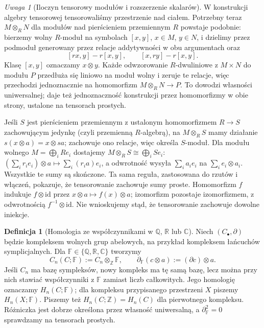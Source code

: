 \documentclass[11pt,a4paper,oneside]{report}
\newcommand{\R}{\mathbb{R}}
\newcommand{\C}{\mathbb{C}}
\newcommand{\Z}{\mathbb{Z}}
\newcommand{\Q}{\mathbb{Q}}
\newcommand{\id}{\mathrm{id}}
\theoremstyle{plain}
\theoremstyle{definition}
\newtheorem{definicja}[twierdzenie]{Definicja}
\theoremstyle{remark}
\newtheorem{uwaga}[twierdzenie]{Uwaga}
\begin{document}
\begin{uwaga}[Iloczyn tensorowy modułów i rozszerzenie skalarów]
\label{uwaga:tensor-modulow}
W konstrukcji algebry tensorowej tensorowaliśmy przestrzenie
nad ciałem. Potrzebny teraz $M\otimes_R N$ dla modułów nad
pierścieniem przemiennym $R$ powstaje podobnie: bierzemy wolny
$R$-moduł na symbolach $[x,y]$, $x\in M$, $y\in N$, i dzielimy
przez podmoduł generowany przez relacje addytywności w obu argumentach
oraz
\[
 [rx,y]-r[x,y],\qquad [x,ry]-r[x,y].
\]
Klasę $[x,y]$ oznaczamy $x\otimes y$. Każde odwzorowanie
$R$-dwuliniowe z $M\times N$ do modułu $P$ przedłuża się liniowo
na moduł wolny i zeruje te relacje, więc przechodzi jednoznacznie
na homomorfizm $M\otimes_R N\to P$. To dowodzi własności uniwersalnej;
daje też jednoznaczność konstrukcji przez homomorfizmy w obie strony,
ustalone na tensorach prostych.

Jeśli $S$ jest pierścieniem przemiennym z ustalonym homomorfizmem
$R\to S$ zachowującym jedynkę (czyli przemienną $R$-algebrą),
na $M\otimes_R S$ mamy
działanie $s(x\otimes a)=x\otimes sa$; zachowuje ono relacje,
więc określa $S$-moduł. Dla modułu wolnego
$M=\bigoplus_i Re_i$ dostajemy
$M\otimes_R S\cong\bigoplus_i Se_i$:
$ (\sum_i r_i e_i)\otimes a\mapsto\sum_i(r_i a)e_i$,
a odwrotność wysyła $\sum_i a_i e_i$ na $\sum_i e_i\otimes a_i$.
Wszystkie te sumy są skończone.
Ta sama reguła, zastosowana do rzutów i włączeń, pokazuje,
że tensorowanie zachowuje sumy proste. Homomorfizm $f$ indukuje
$f\otimes\id$ przez $x\otimes a\mapsto f(x)\otimes a$;
izomorfizm pozostaje izomorfizmem, z odwrotnością
$f^{-1}\otimes\id$. Nie wnioskujemy stąd, że tensorowanie
zachowuje dowolne iniekcje.
\end{uwaga}

\begin{definicja}[Homologia ze współczynnikami w $\Q$, $\R$ lub $\C$]
\label{def:homologia-ciala-char-zero}
Niech $(C_\bullet,\partial)$ będzie kompleksem
wolnych grup abelowych, na przykład
kompleksem łańcuchów symplicjalnych.
Dla $\mathbb F\in\{\Q,\R,\C\}$ tworzymy
\[
 C_n(C;\mathbb F):=C_n\otimes_{\Z}\mathbb F,
 \qquad
 \partial_{\mathbb F}(c\otimes a)
       :=(\partial c)\otimes a.
\]
Jeśli $C_n$ ma bazę sympleksów, nowy kompleks
ma tę samą bazę, lecz można przy nich stawiać
współczynniki z $\mathbb F$ zamiast liczb całkowitych.
Jego homologię oznaczamy $H_n(C;\mathbb F)$;
dla kompleksu przypisanego przestrzeni $X$
piszemy $H_n(X;\mathbb F)$.
Piszemy też $H_n(C;\Z)=H_n(C)$ dla pierwotnego kompleksu.
Różniczka jest dobrze określona przez własność uniwersalną,
a $\partial_{\mathbb F}^2=0$ sprawdzamy na tensorach prostych.
\end{definicja}
\end{document}
